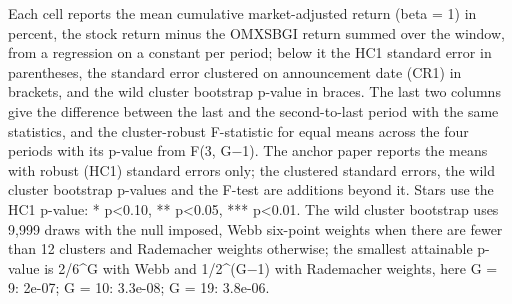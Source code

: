 \begin{threeparttable}
\begin{minipage}{\linewidth}
Each cell reports the mean cumulative market-adjusted return (beta = 1) in percent, the stock return minus the OMXSBGI return summed over the window, from a regression on a constant per period; below it the HC1 standard error in parentheses, the standard error clustered on announcement date (CR1) in brackets, and the wild cluster bootstrap p-value in braces. The last two columns give the difference between the last and the second-to-last period with the same statistics, and the cluster-robust F-statistic for equal means across the four periods with its p-value from F(3, G$-$1). The anchor paper reports the means with robust (HC1) standard errors only; the clustered standard errors, the wild cluster bootstrap p-values and the F-test are additions beyond it. Stars use the HC1 p-value: * p<0.10, ** p<0.05, *** p<0.01. The wild cluster bootstrap uses 9,999 draws with the null imposed, Webb six-point weights when there are fewer than 12 clusters and Rademacher weights otherwise; the smallest attainable p-value is 2/6\textasciicircum{}G with Webb and 1/2\textasciicircum{}(G$-$1) with Rademacher weights, here G = 9: 2e-07; G = 10: 3.3e-08; G = 19: 3.8e-06.\end{minipage}

\end{threeparttable}